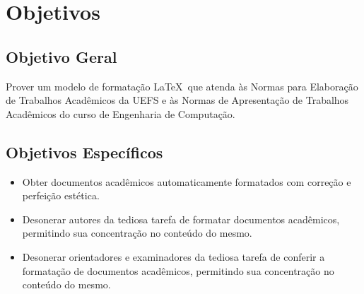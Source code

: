 \section{Objetivos}

\subsection{Objetivo Geral}

Prover um modelo de formata\c{c}\~ao \LaTeX\ que atenda \`as Normas para Elabora\c{c}\~ao de Trabalhos Acad\^emicos da UEFS e \`as Normas de Apresenta\c{c}\~ao de Trabalhos Acad\^emicos do curso de Engenharia de Computa\c{c}\~ao.

\subsection{Objetivos Espec\'ificos}

\begin{itemize}
	\item Obter documentos acad\^emicos automaticamente formatados com corre\c{c}\~ao e perfei\c{c}\~ao est\'etica.
	\item Desonerar autores da tediosa tarefa de formatar documentos acad\^emicos, permitindo sua concentra\c{c}\~ao no conte\'udo do mesmo.
	\item Desonerar orientadores e examinadores da tediosa tarefa de conferir a formata\c{c}\~ao de documentos acad\^emicos, permitindo sua concentra\c{c}\~ao no conte\'udo do mesmo.
\end{itemize}
